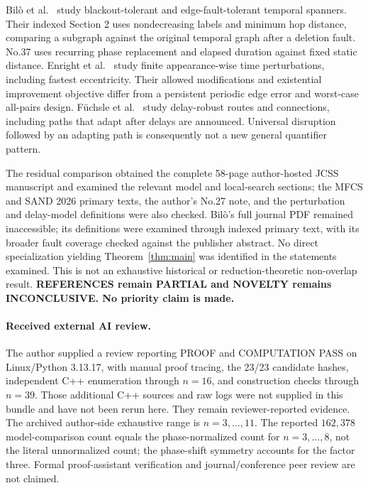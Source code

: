 \documentclass[11pt,a4paper]{article}
\begin{document}
Bil\`o et al.~\cite{bilo} study blackout-tolerant and edge-fault-tolerant temporal spanners. Their indexed Section 2 uses nondecreasing labels and minimum hop distance, comparing a subgraph against the original temporal graph after a deletion fault. No.37 uses recurring phase replacement and elapsed duration against fixed static distance. Enright et al.~\cite{enright} study finite appearance-wise time perturbations, including fastest eccentricity. Their allowed modifications and existential improvement objective differ from a persistent periodic edge error and worst-case all-pairs design. F\"uchsle et al.~\cite{fuchsle1,fuchsle2} study delay-robust routes and connections, including paths that adapt after delays are announced. Universal disruption followed by an adapting path is consequently not a new general quantifier pattern.

The residual comparison obtained the complete 58-page author-hosted JCSS manuscript and examined the relevant model and local-search sections; the MFCS and SAND 2026 primary texts, the author's No.27 note, and the perturbation and delay-model definitions were also checked. Bil\`o's full journal PDF remained inaccessible; its definitions were examined through indexed primary text, with its broader fault coverage checked against the publisher abstract. No direct specialization yielding Theorem~\ref{thm:main} was identified in the statements examined. This is not an exhaustive historical or reduction-theoretic non-overlap result. \textbf{REFERENCES remain PARTIAL and NOVELTY remains INCONCLUSIVE. No priority claim is made.}

\paragraph{Received external AI review.}
The author supplied a review reporting PROOF and COMPUTATION PASS on Linux/Python 3.13.17, with manual proof tracing, the 23/23 candidate hashes, independent C++ enumeration through $n=16$, and construction checks through $n=39$. Those additional C++ sources and raw logs were not supplied in this bundle and have not been rerun here. They remain reviewer-reported evidence. The archived author-side exhaustive range is $n=3,\ldots,11$. The reported $162{,}378$ model-comparison count equals the phase-normalized count for $n=3,\ldots,8$, not the literal unnormalized count; the phase-shift symmetry accounts for the factor three. Formal proof-assistant verification and journal/conference peer review are not claimed.
\end{document}
